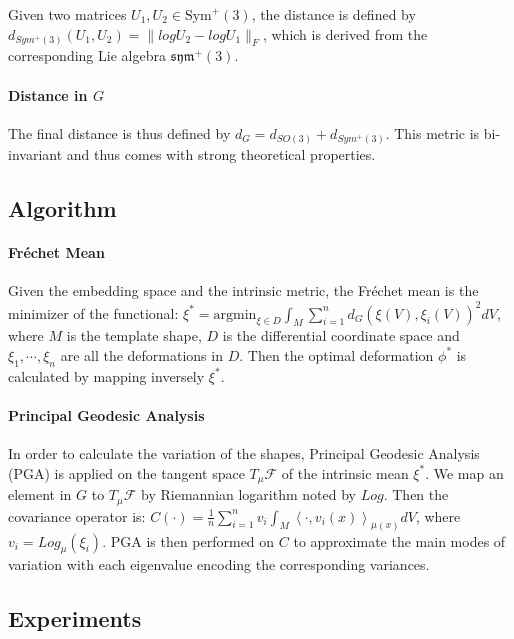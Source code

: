 \documentclass[11pt]{article}
\begin{document}
Given two matrices $U_1, U_2 \in \mbox{Sym}^+ (3)$, the distance is defined by $d_{Sym^+ (3)}(U_1, U_2) = \|log U_2 - log U_1\|_F$, which is derived from the corresponding Lie algebra $\mathfrak{sym}^+ (3)$.

\paragraph{Distance in $G$}

The final distance is thus defined by $d_G = d_{SO(3)} + d_{Sym^+ (3)}$. This metric is bi-invariant
and thus comes with strong theoretical properties.

\subsection{Algorithm}

\paragraph{Fréchet Mean} 

Given the embedding space and the intrinsic metric, the Fréchet mean is the minimizer of the functional: $\xi^* = \mbox{argmin}_{\xi \in D} \int_M \sum_{i=1}^n d_G(\xi(V), \xi_i(V))^2 dV$,
where $M$ is the template shape, $D$ is the differential coordinate space and $\xi_1, \cdots, \xi_n$ are all the deformations in $D$. Then the optimal deformation $\phi^*$ is calculated by mapping inversely $\xi^*$.

\paragraph{Principal Geodesic Analysis}

In order to calculate the variation of the shapes, Principal Geodesic Analysis (PGA) is applied on the tangent space $T_\mu \mathcal{F}$ of the intrinsic mean $\xi^*$.
We map an element in $G$ to $T_\mu \mathcal{F}$ by Riemannian logarithm noted by $Log$. Then the covariance operator is: $C(\cdot) = \frac{1}{n} \sum_{i=1}^n v_i \int_M \left \langle \cdot, v_i(x) \right \rangle_{\mu (x)} dV$, where $v_i = Log_\mu (\xi_i) $.
PGA is then performed on $C$ to approximate the main modes of variation with each eigenvalue encoding the corresponding
variances.

\subsection{Experiments}
\end{document}
